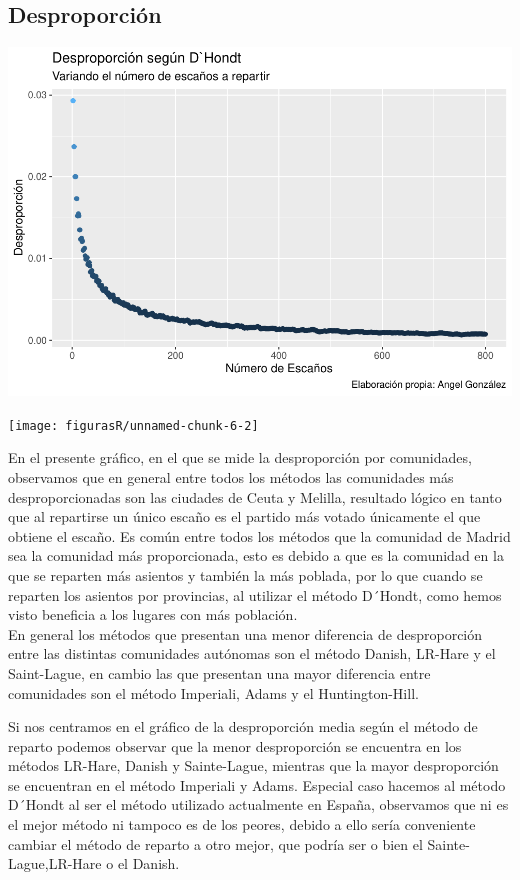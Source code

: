 \documentclass[12pt,a4paper,]{book}
\numberwithin{dummy}{section}
\theoremstyle{ocrenumbox}
\theoremstyle{blacknumex}
\theoremstyle{blacknumbox}
\theoremstyle{ocrenum}
\theoremstyle{ocrenum}
\begin{document}
\hypertarget{desproporciuxf3n}{%
\subsection{Desproporción}\label{desproporciuxf3n}}

\begin{center}\includegraphics[width=1\linewidth]{figurasR/unnamed-chunk-6-1} \end{center}

\begin{center}\texttt{[image: figurasR/unnamed-chunk-6-2]} \end{center}

En el presente gráfico, en el que se mide la desproporción por
comunidades, observamos que en general entre todos los métodos las
comunidades más desproporcionadas son las ciudades de Ceuta y Melilla,
resultado lógico en tanto que al repartirse un único escaño es el
partido más votado únicamente el que obtiene el escaño. Es común entre
todos los métodos que la comunidad de Madrid sea la comunidad más
proporcionada, esto es debido a que es la comunidad en la que se
reparten más asientos y también la más poblada, por lo que cuando se
reparten los asientos por provincias, al utilizar el método D´Hondt,
como hemos visto beneficia a los lugares con más población.\\
En general los métodos que presentan una menor diferencia de
desproporción entre las distintas comunidades autónomas son el método
Danish, LR-Hare y el Saint-Lague, en cambio las que presentan una mayor
diferencia entre comunidades son el método Imperiali, Adams y el
Huntington-Hill.

Si nos centramos en el gráfico de la desproporción media según el método
de reparto podemos observar que la menor desproporción se encuentra en
los métodos LR-Hare, Danish y Sainte-Lague, mientras que la mayor
desproporción se encuentran en el método Imperiali y Adams. Especial
caso hacemos al método D´Hondt al ser el método utilizado actualmente en
España, observamos que ni es el mejor método ni tampoco es de los
peores, debido a ello sería conveniente cambiar el método de reparto a
otro mejor, que podría ser o bien el Sainte-Lague,LR-Hare o el Danish.
\end{document}
